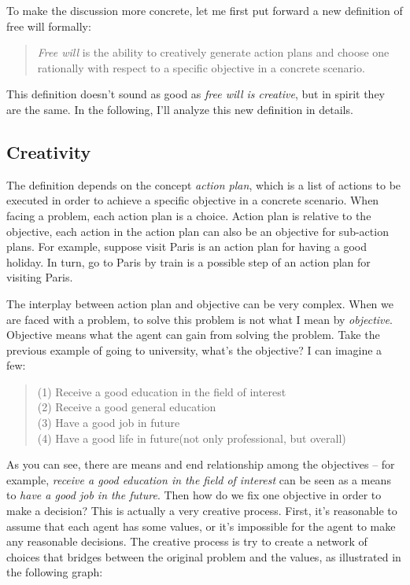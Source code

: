 To make the discussion more concrete, let me first put forward a new definition of free will formally:

\begin{quote}
\emph{Free will} is the ability to creatively generate action plans and choose one rationally with respect to a specific objective in a concrete scenario.
\end{quote}

This definition doesn't sound as good as \emph{free will is creative}, but in spirit they are the same. In the following, I'll analyze this new definition in details.

\subsection{Creativity}

The definition depends on the concept \emph{action plan}, which is a list of actions to be executed in order to achieve a specific objective in a concrete scenario. When facing a problem, each action plan is a choice. Action plan is relative to the objective, each action in the action plan can also be an objective for sub-action plans. For example, suppose visit Paris is an action plan for having a good holiday. In turn, go to Paris by train is a possible step of an action plan for visiting Paris.

The interplay between action plan and objective can be very complex. When we are faced with a problem, to solve this problem is not what I mean by \emph{objective}. Objective means what the agent can gain from solving the problem. Take the previous example of going to university, what's the objective? I can imagine a few:

\begin{quote}
(1) Receive a good education in the field of interest \\
(2) Receive a good general education \\
(3) Have a good job in future \\
(4) Have a good life in future(not only professional, but overall)
\end{quote}

As you can see, there are means and end relationship among the objectives -- for example, \emph{receive a good education in the field of interest} can be seen as a means to \emph{have a good job in the future}. Then how do we fix one objective in order to make a decision? This is actually a very creative process. First, it's reasonable to assume that each agent has some values, or it's impossible for the agent to make any reasonable decisions. The creative process is try to create a network of choices that bridges between the original problem and the values, as illustrated in the following graph:

